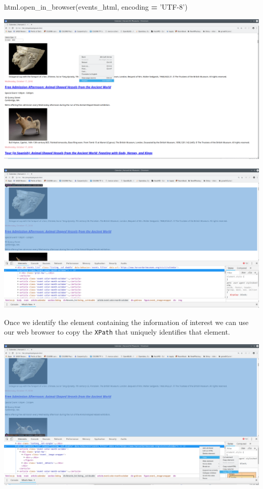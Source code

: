 \documentclass[]{book}
\newenvironment{Shaded}{\begin{snugshade}}{\end{snugshade}}
\newcommand{\NormalTok}[1]{#1}
\newcommand{\OperatorTok}[1]{\textcolor[rgb]{0.81,0.36,0.00}{\textbf{#1}}}
\newcommand{\StringTok}[1]{\textcolor[rgb]{0.31,0.60,0.02}{#1}}
\begin{document}
\begin{Shaded}
\begin{Highlighting}[]
\NormalTok{html.open_in_browser(events_html, encoding }\OperatorTok{=} \StringTok{'UTF-8'}\NormalTok{)}
\end{Highlighting}
\end{Shaded}

\includegraphics{Python/PythonWebScrape/images/dev_tools_right_click.png}

\includegraphics{Python/PythonWebScrape/images/dev_tools_inspect.png}

Once we identify the element containing the information of interest we
can use our web browser to copy the \texttt{XPath} that uniquely identifies
that element.

\includegraphics{Python/PythonWebScrape/images/dev_tools_xpath.png}
\end{document}
